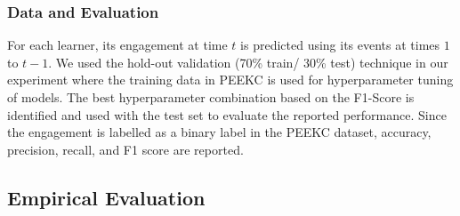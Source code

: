 \documentclass[letterpaper]{article} %
\begin{document}
\subsubsection{Data and Evaluation} For each learner, its engagement at time $t$ is predicted using its events at times $1$ to $t-1$. We used the hold-out validation (70\% train/ 30\% test) technique in our experiment where the training data in PEEKC is used for hyperparameter tuning of models. The best hyperparameter combination based on the F1-Score is identified and used with the test set to evaluate the reported performance. Since the engagement is labelled as a binary label in the PEEKC dataset, accuracy, precision, recall, and F1 score are reported. 


\subsection{Empirical Evaluation}
\end{document}
